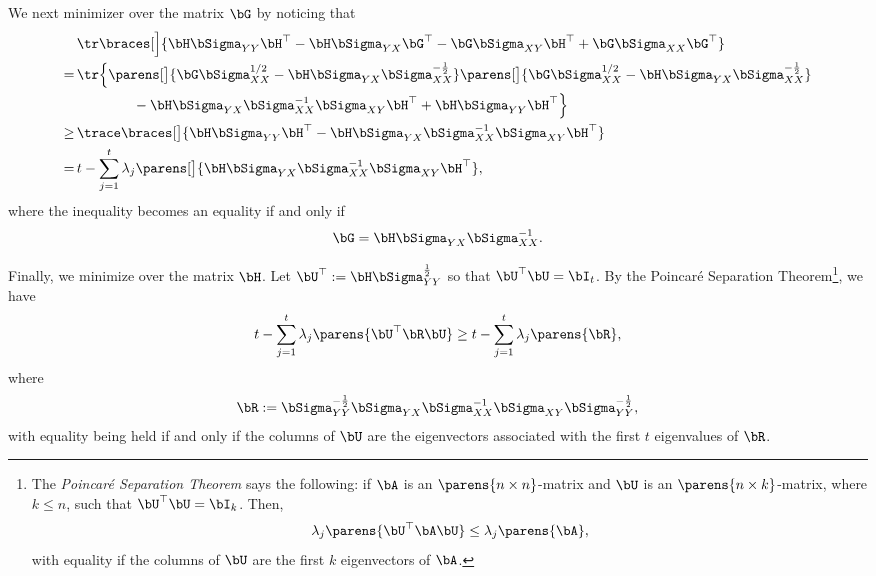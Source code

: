 \documentclass[12pt]{article}
\begin{document}
\begin{enumerate}[label=\textbf{\arabic*.}]
	We next minimizer over the matrix $\bG$ by noticing that 
	\begin{align*}
		& \, \tr \braces[\Big]{\bH \bSigma_{YY} \bH^\top - \bH \bSigma_{YX} \bG^\top - \bG \bSigma_{XY} \bH^\top + \bG \bSigma_{XX} \bG^\top} \\ 
		= & \, \tr \Big\{ \parens[\big]{\bG \bSigma_{XX}^{1/2} - \bH \bSigma_{YX} \bSigma_{XX}^{-\frac{1}{2}}} \parens[\big]{\bG \bSigma_{XX}^{1/2} - \bH \bSigma_{YX} \bSigma_{XX}^{-\frac{1}{2}}}  \\ 
		& \, \qquad \qquad - \bH \bSigma_{YX} \bSigma_{XX}^{-1} \bSigma_{XY} \bH^\top + \bH \bSigma_{YY} \bH^\top \Big\} \\ 
		\ge & \, \trace \braces[\big]{\bH \bSigma_{YY} \bH^\top - \bH \bSigma_{YX} \bSigma_{XX}^{-1} \bSigma_{XY} \bH^\top} \\ 
		= & \, t - \sum_{j=1}^t \lambda_j \parens[\big]{\bH \bSigma_{YX} \bSigma_{XX}^{-1} \bSigma_{XY} \bH^\top},  
	\end{align*}
	where the inequality becomes an equality if and only if 
	\begin{align}
		\bG = \bH \bSigma_{YX} \bSigma_{XX}^{-1}. 
	\end{align}
	
	Finally, we minimize over the matrix $\bH$. Let $\bU^\top := \bH \bSigma_{YY}^{\frac{1}{2}}$ so that $\bU^\top \bU = \bI_t$. By the Poincar{\'e} Separation Theorem\footnote{The \textit{Poincar{\'e} Separation Theorem} says the following: if $\bA$ is an $\parens{n \times n}$-matrix and $\bU$ is an $\parens{n \times k}$-matrix, where $k \le n$, such that $\bU^\top \bU = \bI_k$. Then, 
	\begin{align*}
		\lambda_j \parens{\bU^\top \bA \bU} \le \lambda_j \parens{\bA}, 
	\end{align*}
	with equality if the columns of $\bU$ are the first $k$ eigenvectors of $\bA$.}, we have 
	\begin{align}
		t - \sum_{j=1}^t \lambda_j \parens{\bU^\top \bR \bU} \ge t - \sum_{j=1}^t \lambda_j \parens{\bR}, 
	\end{align}
	where 
	\begin{align}
		\bR := \bSigma_{YY}^{-\frac{1}{2}} \bSigma_{YX} \bSigma_{XX}^{-1} \bSigma_{XY} \bSigma_{YY}^{-\frac{1}{2}}, 
	\end{align}
	with equality being held if and only if the columns of $\bU$ are the eigenvectors associated with the first $t$ eigenvalues of $\bR$. 
	

\end{enumerate}
\end{document}
